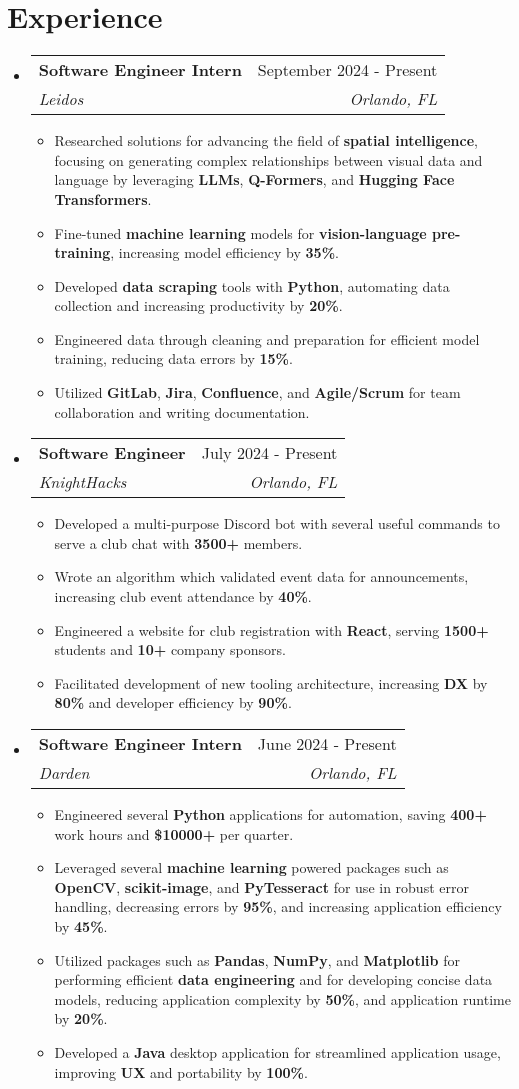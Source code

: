 \documentclass[letterpaper,11pt]{article}
\makeatletter
\newcommand{\resumeItem}[1]{
  \item\small{
    {#1 \vspace{-2pt}}
  }
}
\newcommand{\resumeSubheading}[4]{
  \vspace{-2pt}\item
    \begin{tabular*}{0.97\textwidth}[t]{l@{\extracolsep{\fill}}r}
      \textbf{#1} & #2 \\
      \textit{\small#3} & \textit{\small #4} \\
    \end{tabular*}\vspace{-7pt}
}
\newcommand{\resumeSubHeadingListStart}{\begin{itemize}[leftmargin=0.15in, label={}]}
\newcommand{\resumeSubHeadingListEnd}{\end{itemize}}
\newcommand{\resumeItemListStart}{\begin{itemize}}
\newcommand{\resumeItemListEnd}{\end{itemize}\vspace{-5pt}}
\makeatother
\begin{document}
\section{Experience}
  \resumeSubHeadingListStart
      \resumeSubheading
      {Software Engineer Intern}{September 2024 - Present}
      {Leidos}{Orlando, FL}
      \resumeItemListStart
        \resumeItem{Researched solutions for advancing the field of \textbf{spatial intelligence}, focusing on generating complex relationships between visual data and language by leveraging \textbf{LLMs}, \textbf{Q-Formers}, and \textbf{Hugging Face Transformers}.}
        \resumeItem{Fine-tuned \textbf{machine learning} models for \textbf{vision-language pre-training}, increasing model efficiency by \textbf{35\%}.}
        \resumeItem{Developed \textbf{data scraping} tools with \textbf{Python}, automating data collection and increasing productivity by \textbf{20\%}.}
        \resumeItem{Engineered data through cleaning and preparation for efficient model training, reducing data errors by \textbf{15\%}. }
        \resumeItem{Utilized \textbf{GitLab}, \textbf{Jira}, \textbf{Confluence}, and \textbf{Agile/Scrum} for team collaboration and writing documentation.}
    \resumeItemListEnd
    \resumeSubheading
      {Software Engineer}{July 2024 - Present}
      {KnightHacks}{Orlando, FL}
      \resumeItemListStart
        \resumeItem{Developed a multi-purpose Discord bot with several useful commands to serve a club chat with \textbf{3500+} members.}
        \resumeItem{Wrote an algorithm which validated event data for announcements, increasing club event attendance by \textbf{40\%}.}
        \resumeItem{Engineered a website for club registration with \textbf{React}, serving \textbf{1500+} students and \textbf{10+} company sponsors.}
        \resumeItem{Facilitated development of new tooling architecture, increasing \textbf{DX} by \textbf{80\%} and developer efficiency by \textbf{90\%}.}
    \resumeItemListEnd
    \resumeSubheading
      {Software Engineer Intern}{June 2024 - Present}
      {Darden}{Orlando, FL}
      \resumeItemListStart
        \resumeItem{Engineered several \textbf{Python} applications for automation, saving \textbf{400+} work hours and \textbf{\$10000+} per quarter.}
        \resumeItem{Leveraged several \textbf{machine learning} powered packages such as \textbf{OpenCV}, \textbf{scikit-image}, and \textbf{PyTesseract} for use in robust error handling, decreasing errors by \textbf{95\%}, and increasing application efficiency by \textbf{45\%}.}
        \resumeItem{Utilized packages such as \textbf{Pandas}, \textbf{NumPy}, and \textbf{Matplotlib} for performing efficient \textbf{data engineering} and for developing concise data models, reducing application complexity by \textbf{50\%}, and application runtime by \textbf{20\%}.}
        \resumeItem{Developed a \textbf{Java} desktop application for streamlined application usage, improving \textbf{UX} and portability by \textbf{100\%}.}
    \resumeItemListEnd
    \resumeSubHeadingListEnd
\end{document}
